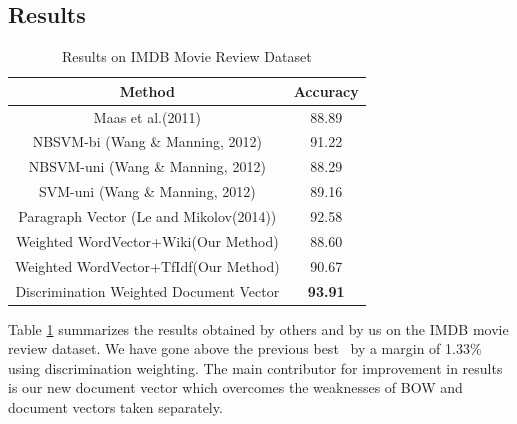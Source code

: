 \documentclass[11pt,a4paper]{article}
\begin{document}
\subsection{Results}
\label{sec:results}

\begin {table}[H]
\centering
\small
\begin{tabular}{ | c | c | }
\hline
\textbf{Method} & \textbf{Accuracy} \\ \hline
Maas et al.(2011) & 88.89\\ \hline
NBSVM-bi (Wang \& Manning, 2012) & 91.22\\ \hline
NBSVM-uni (Wang \& Manning, 2012) & 88.29\\ \hline
SVM-uni (Wang \& Manning, 2012) & 89.16\\ \hline
Paragraph Vector (Le and Mikolov(2014)) & 92.58\\ \hline
Weighted WordVector+Wiki(Our Method) & 88.60\\ \hline
Weighted WordVector+TfIdf(Our Method) & 90.67\\ \hline
Discrimination Weighted Document Vector & \textbf{93.91}\\ \hline

\end{tabular}
\caption {Results on IMDB Movie Review Dataset}
\label{table:IMDB}
\end{table}

Table \ref{table:IMDB} summarizes the results obtained by others and by us on the IMDB movie review dataset. We have gone above the previous best~\cite{Le:14} by a margin of 1.33\% using discrimination weighting. The main contributor for improvement in results is our new document vector which overcomes the weaknesses of BOW and document vectors taken separately.
\end{document}
